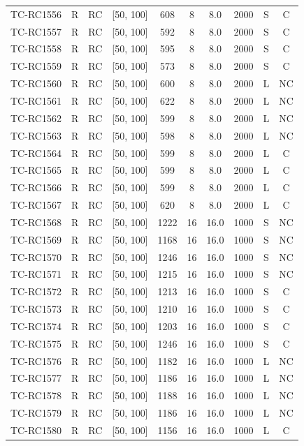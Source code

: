 \begin{longtable}{lccccccccc}
TC-RC1556 & R & RC & [50, 100] & 608 & 8 & 8.0 & 2000 & S & C \\
TC-RC1557 & R & RC & [50, 100] & 592 & 8 & 8.0 & 2000 & S & C \\
TC-RC1558 & R & RC & [50, 100] & 595 & 8 & 8.0 & 2000 & S & C \\
TC-RC1559 & R & RC & [50, 100] & 573 & 8 & 8.0 & 2000 & S & C \\
TC-RC1560 & R & RC & [50, 100] & 600 & 8 & 8.0 & 2000 & L & NC \\
TC-RC1561 & R & RC & [50, 100] & 622 & 8 & 8.0 & 2000 & L & NC \\
TC-RC1562 & R & RC & [50, 100] & 599 & 8 & 8.0 & 2000 & L & NC \\
TC-RC1563 & R & RC & [50, 100] & 598 & 8 & 8.0 & 2000 & L & NC \\
TC-RC1564 & R & RC & [50, 100] & 599 & 8 & 8.0 & 2000 & L & C \\
TC-RC1565 & R & RC & [50, 100] & 599 & 8 & 8.0 & 2000 & L & C \\
TC-RC1566 & R & RC & [50, 100] & 599 & 8 & 8.0 & 2000 & L & C \\
TC-RC1567 & R & RC & [50, 100] & 620 & 8 & 8.0 & 2000 & L & C \\
TC-RC1568 & R & RC & [50, 100] & 1222 & 16 & 16.0 & 1000 & S & NC \\
TC-RC1569 & R & RC & [50, 100] & 1168 & 16 & 16.0 & 1000 & S & NC \\
TC-RC1570 & R & RC & [50, 100] & 1246 & 16 & 16.0 & 1000 & S & NC \\
TC-RC1571 & R & RC & [50, 100] & 1215 & 16 & 16.0 & 1000 & S & NC \\
TC-RC1572 & R & RC & [50, 100] & 1213 & 16 & 16.0 & 1000 & S & C \\
TC-RC1573 & R & RC & [50, 100] & 1210 & 16 & 16.0 & 1000 & S & C \\
TC-RC1574 & R & RC & [50, 100] & 1203 & 16 & 16.0 & 1000 & S & C \\
TC-RC1575 & R & RC & [50, 100] & 1246 & 16 & 16.0 & 1000 & S & C \\
TC-RC1576 & R & RC & [50, 100] & 1182 & 16 & 16.0 & 1000 & L & NC \\
TC-RC1577 & R & RC & [50, 100] & 1186 & 16 & 16.0 & 1000 & L & NC \\
TC-RC1578 & R & RC & [50, 100] & 1188 & 16 & 16.0 & 1000 & L & NC \\
TC-RC1579 & R & RC & [50, 100] & 1186 & 16 & 16.0 & 1000 & L & NC \\
TC-RC1580 & R & RC & [50, 100] & 1156 & 16 & 16.0 & 1000 & L & C \\

\end{longtable}
